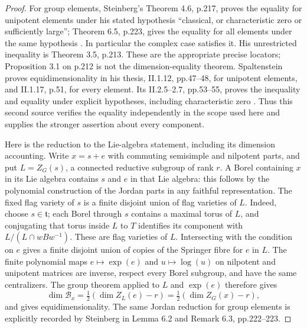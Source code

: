\begin{proof}
For group elements, Steinberg's Theorem 4.6, p.217, proves
the equality for unipotent elements under his stated hypothesis
``classical, or characteristic zero or sufficiently large'';
Theorem 6.5, p.223, gives the equality for all elements under
the same hypothesis \cite{D-Steinberg1976}.  In particular the
complex case satisfies it.  His unrestricted inequality is
Theorem 3.5, p.213.  These are the appropriate precise locators;
Proposition 3.1 on p.212 is not the dimension-equality theorem.
Spaltenstein proves equidimensionality in his thesis,
II.1.12, pp.47--48, for unipotent elements, and II.1.17, p.51,
for every element.  Its II.2.5--2.7, pp.53--55, proves the
inequality and equality under explicit hypotheses, including
characteristic zero \cite{D-SpaltensteinThesis}.  Thus this
second source verifies the equality independently in the
scope used here and supplies the stronger assertion about
every component.

Here is the reduction to the Lie-algebra statement, including
its dimension accounting.  Write $x=s+e$ with commuting
semisimple and nilpotent parts, and put $L=Z_G(s)$, a connected
reductive subgroup of rank $r$.  A Borel containing $x$ in its
Lie algebra contains $s$ and $e$ in that Lie algebra: this
follows by the polynomial construction of the Jordan parts
in any faithful representation.  The fixed flag variety of
$s$ is a finite disjoint union of flag varieties of $L$.
Indeed, choose $s\in\mathfrak t$; each Borel through $s$
contains a maximal torus of $L$, and conjugating that torus
inside $L$ to $T$ identifies its component with
$L/(L\cap wBw^{-1})$.  These are flag varieties of $L$.
Intersecting with the condition on $e$ gives a finite disjoint
union of copies of the Springer fibre for $e$ in $L$.
The finite polynomial maps $e\mapsto\exp(e)$ and
$u\mapsto\log(u)$ on nilpotent and unipotent matrices are
inverse, respect every Borel subgroup, and have the same
centralizers.  The group theorem applied to $L$ and $\exp(e)$
therefore gives
\[
 \dim\mathcal B_x=\tfrac12(\dim Z_L(e)-r)
                =\tfrac12(\dim Z_G(x)-r),
\]
and gives equidimensionality.  The same Jordan reduction for
group elements is explicitly recorded by Steinberg in
Lemma 6.2 and Remark 6.3, pp.222--223.
\end{proof}

